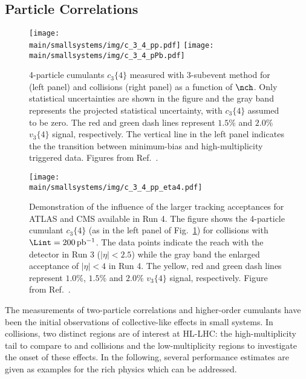 \documentclass[../report.tex]{subfiles}
\providecommand{\main}{..}
\begin{document}
\subsection{Particle Correlations}
\label{sect:smallsystems_correlations}

\begin{figure}[t]
\centering
\texttt{[image: \\main/smallsystems/img/c\_3\_4\_pp.pdf]}
\hfill
\texttt{[image: \\main/smallsystems/img/c\_3\_4\_pPb.pdf]}
\caption{4-particle cumulants $c_3\{4\}$ measured with 3-subevent method for \pp (left panel) and \pPb collisions (right panel) as a function of $\nch$. Only statistical uncertainties are shown in the figure and the gray band represents the projected statistical uncertainty, with $c_3\{4\}$ assumed to be zero. The red and green dash lines represent $1.5\%$ and $2.0\%$ $v_3\{4\}$ signal, respectively. The vertical line in the left panel indicates the the transition between minimum-bias and high-multiplicity triggered data. Figures from Ref.~\cite{ATL-PHYS-PUB-2018-014}.}
\label{fig:smallsystems_corr_cumulants}
\end{figure}

\begin{figure}[t]
\centering
\texttt{[image: \\main/smallsystems/img/c\_3\_4\_pp\_eta4.pdf]}
\caption{Demonstration of the influence of the larger tracking acceptances for ATLAS and CMS available in Run 4. The figure shows the 4-particle cumulant $c_3\{4\}$ (as in the left panel of Fig.~\ref{fig:smallsystems_corr_cumulants}) for \pp collisions with $\Lint = \unit[200]{pb^{-1}}$. The data points indicate the reach with the detector in Run 3 ($|\eta| < 2.5$) while the gray band the enlarged acceptance of $|\eta| < 4$ in Run 4. The yellow, red and green dash lines represent $1.0\%$, $1.5\%$ and $2.0\%$ $v_3\{4\}$ signal, respectively. Figure from Ref.~\cite{ATL-PHYS-PUB-2018-014}.}
\label{fig:smallsystems_corr_cumulants_eta4}
\end{figure}

The measurements of two-particle correlations and higher-order cumulants have been the initial observations of collective-like effects in small systems. In \pp collisions, two distinct regions are of interest at HL-LHC: the high-multiplicity tail to compare to \pPb and \PbPb collisions and the low-multiplicity regions to investigate the onset of these effects. In the following, several performance estimates are given as examples for the rich physics which can be addressed.
\end{document}
